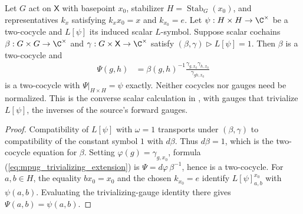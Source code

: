 \begin{lemma}
    \label{lem:mpug_trivializing_extension}
    \leanok
    Let $G$ act on $\mathsf X$ with basepoint $x_0$, stabilizer
    $H=\operatorname{Stab}_G(x_0)$, and representatives $k_x$ satisfying
    $k_xx_0=x$ and $k_{x_0}=e$. Let $\psi:H\times H\to\C^\times$ be a
    two-cocycle and $L[\psi]$ its induced scalar $L$-symbol.
    Suppose scalar cochains $\beta:G\times G\to\C^\times$ and
    $\gamma:G\times\mathsf X\to\C^\times$ satisfy
    $(\beta,\gamma)\mathbin{\triangleright}L[\psi]=1$.
    Then $\beta$ is a two-cocycle and
    \begin{align}
        \Psi(g,h)
         & =\beta(g,h)^{-1}
        \frac{\gamma_{g,x_0}\gamma_{h,x_0}}{\gamma_{gh,x_0}}
        \label{eq:mpug_trivializing_extension}
    \end{align}
    is a two-cocycle with $\Psi|_{H\times H}=\psi$ exactly.
    Neither cocycles nor gauges need be normalized.
    This is the converse scalar calculation in
    \cite[lines~7057--7064]{FrancoRubio2025MPUGauging}, with gauges that
    trivialize $L[\psi]$, the inverses of the source's forward gauges.
\end{lemma}
\begin{proof}\leanok
    Compatibility of $L[\psi]$ with $\omega=1$ transports under
    $(\beta,\gamma)$ to compatibility of the constant symbol $1$ with
    $d\beta$. Thus $d\beta=1$, which is the two-cocycle equation for
    $\beta$. Setting $\varphi(g)=\gamma_{g,x_0}$, formula
    (\ref{eq:mpug_trivializing_extension}) is
    $\Psi=d\varphi\,\beta^{-1}$, hence is a two-cocycle.
    For $a,b\in H$, the equality $bx_0=x_0$ and the chosen
    $k_{x_0}=e$ identify $L[\psi]^{x_0}_{a,b}$ with $\psi(a,b)$.
    Evaluating the trivializing-gauge identity there gives
    $\Psi(a,b)=\psi(a,b)$.
\end{proof}

